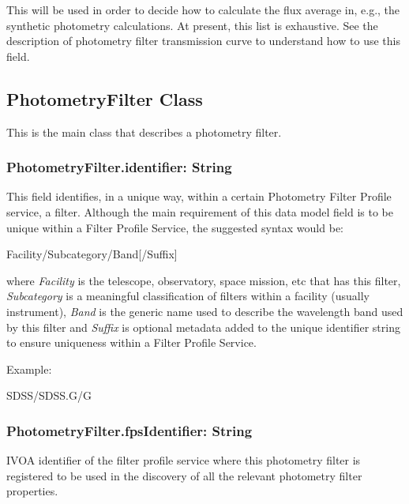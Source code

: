 \documentclass[11pt,a4paper]{ivoa}
\begin{document}

This will be used in order to decide how to calculate the 
flux average in, e.g., the synthetic photometry calculations. 
At present, this list is exhaustive. 
See the description of photometry filter 
transmission curve to understand how to use this field.
\par

\subsection{PhotometryFilter Class}
This is the main class that describes a photometry filter.
\par

\subsubsection{PhotometryFilter.identifier: String}
This field identifies, in a unique way, within a certain Photometry 
Filter Profile service, a filter. Although the main requirement of 
this data model field is to be unique within a Filter Profile Service, 
the suggested syntax would be:
\par


Facility/Subcategory/Band[/Suffix]
\bigskip


where \textit{Facility} is the telescope, observatory, space mission, 
etc that has this filter, \textit{Subcategory} is a meaningful 
classification of filters within a facility (usually instrument), 
\textit{Band} is the generic name used to describe the wavelength 
band used by this filter and \textit{Suffix} is optional metadata added 
to the unique identifier string to ensure uniqueness within a Filter 
Profile Service.
\par

Example:
\par
SDSS/SDSS.G/G
\bigskip


\subsubsection{PhotometryFilter.fpsIdentifier: String}
IVOA identifier of the filter profile service where this photometry 
filter is registered to be used in the discovery of all the relevant 
photometry filter properties.
\par
\end{document}
